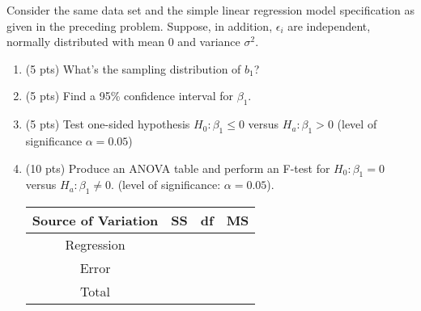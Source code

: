 \documentclass[12pt]{article}
\begin{document}
 {
Consider the same data set and the simple linear regression model specification
as given in the preceding problem. Suppose, in addition, $\epsilon_i$ are independent,
normally distributed with mean 0 and variance $\sigma^2$.
\begin{enumerate}
 \item (5 pts) What's the sampling distribution of $b_1$?
  \item (5 pts) Find a 95\% confidence interval for $\beta_1$.
  \item (5 pts) Test one-sided hypothesis $H_0: \beta_1\leq 0$ versus $H_a: \beta_1>0$ (level of significance $\alpha=0.05$)
  \item (10 pts) Produce an ANOVA table and perform an F-test for $H_0: \beta_1=0$ versus $H_a: \beta_1\neq 0$. (level of significance: $\alpha=0.05$).
      \begin{table}[!h]
\begin{center}

\begin{tabular}{|c|c|c|c|}
\hline Source of Variation& SS& df& MS \\\hline
Regression&\qquad\qquad\qquad \qquad &\qquad\qquad\qquad\qquad&\qquad\qquad\qquad\qquad\\\hline
Error& &&\\\hline
Total& &&\\\hline
\end{tabular}
\end{center}
\end{table}
\end{enumerate}
}
 { \vfill
  \answer
} {  }
\newpage
\end{document}
